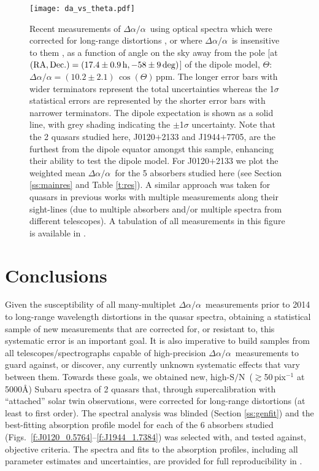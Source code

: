 \documentclass[fleqn,usenatbib,usedcolumn]{mnras}
\renewcommand{\la}{\lesssim} %
\renewcommand{\ga}{\gtrsim} %
\newcommand{\Sref}[1]{Section \ref{#1}}
\newcommand{\Tref}[1]{Table \ref{#1}}
\newcommand{\SN}{\ensuremath{\textrm{S/N}}}
\newcommand{\daa}{\ensuremath{\Delta\alpha/\alpha}}
\begin{document}
\begin{figure}
\begin{center}
\texttt{[image: da\_vs\_theta.pdf]}\vspace{-1em}
\caption{Recent measurements of \daa\ using optical spectra which were corrected for long-range distortions \citep[][and this work's results]{Evans:2014:128,Kotus:2017:3679}, or where \daa\ is insensitive to them \citep{Murphy:2016:2461}, as a function of angle on the sky away from the pole [at ${\rm (RA,Dec.)}=(17.4\pm0.9\,{\rm h},-58\pm9\,{\rm deg})$] of the \citet{King:2012:3370} dipole model, $\Theta$: $\daa=(10.2\pm2.1)\,\cos(\Theta)$\,ppm. The longer error bars with wider terminators represent the total uncertainties whereas the 1$\sigma$ statistical errors are represented by the shorter error bars with narrower terminators. The dipole expectation is shown as a solid line, with grey shading indicating the $\pm$1$\sigma$ uncertainty. Note that the 2 quasars studied here, J0120$+$2133 and J1944$+$7705, are the furthest from the dipole equator amongst this sample, enhancing their ability to test the dipole model. For J0120$+$2133 we plot the weighted mean \daa\ for the 5 absorbers studied here (see \Sref{ss:mainres} and \Tref{t:res}). A similar approach was taken for quasars in previous works with multiple measurements along their sight-lines (due to multiple absorbers and/or multiple spectra from different telescopes). A tabulation of all measurements in this figure is available in \citet{Murphy:2017:alphaSubaru}.}
\label{f:da_vs_theta}
\end{center}
\end{figure}


\section{Conclusions}\label{s:conclusion}

Given the susceptibility of all many-multiplet \daa\ measurements prior to 2014 to long-range wavelength distortions in the quasar spectra, obtaining a statistical sample of new measurements that are corrected for, or resistant to, this systematic error is an important goal. It is also imperative to build samples from all telescopes/spectrographs capable of high-precision \daa\ measurements to guard against, or discover, any currently unknown systematic effects that vary between them. Towards these goals, we obtained new, high-\SN\ ($\ga$50\,pix$^{-1}$ at 5000\AA) Subaru spectra of 2 quasars that, through supercalibration with ``attached'' solar twin observations, were corrected for long-range distortions (at least to first order). The spectral analysis was blinded (\Sref{ss:genfit}) and the best-fitting absorption profile model for each of the 6 absorbers studied (Figs.\ \ref{f:J0120_0.5764}--\ref{f:J1944_1.7384}) was selected with, and tested against, objective criteria. The spectra and fits to the absorption profiles, including all parameter estimates and uncertainties, are provided for full reproducibility in \citet{Murphy:2017:alphaSubaru}.
\end{document}
